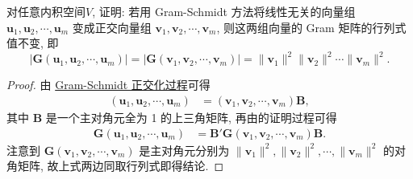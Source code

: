 \documentclass[../../main.tex]{subfiles}%
\begin{document}
\begin{proposition}\label{proposition:例9.15}
对任意内积空间$V$,
证明: 若用 Gram-Schmidt 方法将线性无关的向量组 $\boldsymbol{u}_1,\boldsymbol{u}_2,\cdots,\boldsymbol{u}_m$ 变成正交向量组 $\boldsymbol{v}_1,\boldsymbol{v}_2,\cdots,\boldsymbol{v}_m$, 则这两组向量的 Gram 矩阵的行列式值不变, 即
\[
|\boldsymbol{G}(\boldsymbol{u}_1,\boldsymbol{u}_2,\cdots,\boldsymbol{u}_m)| = |\boldsymbol{G}(\boldsymbol{v}_1,\boldsymbol{v}_2,\cdots,\boldsymbol{v}_m)| = \|\boldsymbol{v}_1\|^2\|\boldsymbol{v}_2\|^2\cdots\|\boldsymbol{v}_m\|^2.
\]
\end{proposition}
\begin{proof}

由 \hyperref[theorem:Gram-Schmidt正交化方法]{Gram-Schmidt 正交化过程}可得
\begin{align*}
(\boldsymbol{u}_1,\boldsymbol{u}_2,\cdots,\boldsymbol{u}_m) &= (\boldsymbol{v}_1,\boldsymbol{v}_2,\cdots,\boldsymbol{v}_m)\boldsymbol{B},
\end{align*}
其中 $\boldsymbol{B}$ 是一个主对角元全为 1 的上三角矩阵, 再由的证明过程可得
\begin{align*}
\boldsymbol{G}(\boldsymbol{u}_1,\boldsymbol{u}_2,\cdots,\boldsymbol{u}_m) &= \boldsymbol{B}'\boldsymbol{G}(\boldsymbol{v}_1,\boldsymbol{v}_2,\cdots,\boldsymbol{v}_m)\boldsymbol{B}.
\end{align*}
注意到 $\boldsymbol{G}(\boldsymbol{v}_1,\boldsymbol{v}_2,\cdots,\boldsymbol{v}_m)$ 是主对角元分别为 $\|\boldsymbol{v}_1\|^2,\|\boldsymbol{v}_2\|^2,\cdots,\|\boldsymbol{v}_m\|^2$ 的对角矩阵, 故上式两边同取行列式即得结论. 

\end{proof}
\end{document}
